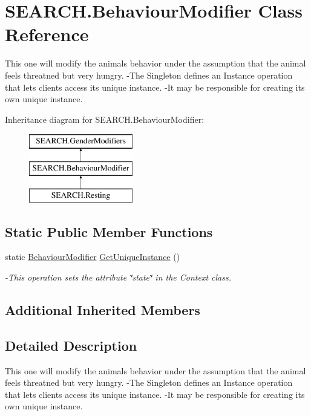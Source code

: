 \hypertarget{class_s_e_a_r_c_h_1_1_behaviour_modifier}{\section{S\-E\-A\-R\-C\-H.\-Behaviour\-Modifier Class Reference}
\label{class_s_e_a_r_c_h_1_1_behaviour_modifier}
}


This one will modify the animals behavior under the assumption that the animal feels threatned but very hungry. -\/\-The Singleton defines an Instance operation that lets clients access its unique instance. -\/\-It may be responsible for creating its own unique instance.  


Inheritance diagram for S\-E\-A\-R\-C\-H.\-Behaviour\-Modifier\-:\begin{figure}[H]
\begin{center}
\leavevmode
\includegraphics[height=3.000000cm]{class_s_e_a_r_c_h_1_1_behaviour_modifier}
\end{center}
\end{figure}
\subsection*{Static Public Member Functions}
\begin{DoxyCompactItemize}
\item 
static \hyperlink{class_s_e_a_r_c_h_1_1_behaviour_modifier}{Behaviour\-Modifier} \hyperlink{class_s_e_a_r_c_h_1_1_behaviour_modifier_a107e2b884bd8b0e26bacd1a475676147}{Get\-Unique\-Instance} ()
\begin{DoxyCompactList}\small\item\em -\/\-This operation sets the attribute \char`\"{}state\char`\"{} in the Context class. \end{DoxyCompactList}\end{DoxyCompactItemize}
\subsection*{Additional Inherited Members}


\subsection{Detailed Description}
This one will modify the animals behavior under the assumption that the animal feels threatned but very hungry. -\/\-The Singleton defines an Instance operation that lets clients access its unique instance. -\/\-It may be responsible for creating its own unique instance. 

